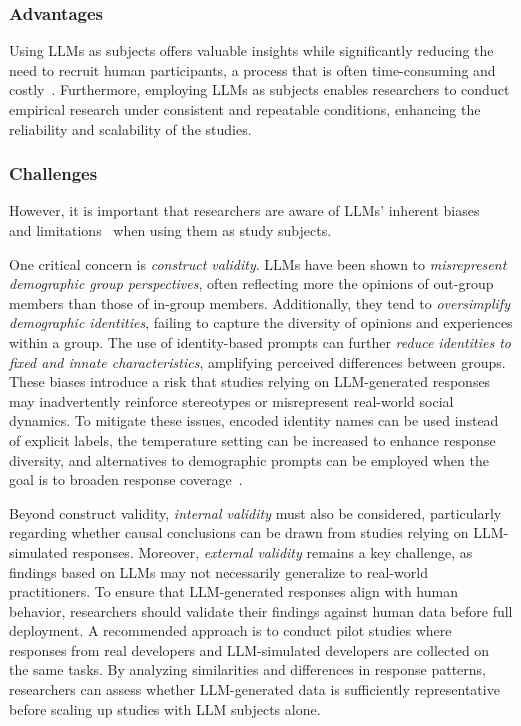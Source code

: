 \subsubsection{Advantages}

Using LLMs as subjects offers valuable insights while significantly reducing the need to recruit human participants, a process that is often time-consuming and costly~\cite{DBLP:conf/vl/Madampe0HO24}. 
Furthermore, employing LLMs as subjects enables researchers to conduct empirical research under consistent and repeatable conditions, enhancing the reliability and scalability of the studies.

\subsubsection{Challenges}

However, it is important that researchers are aware of LLMs' inherent biases~\cite{Crowell2023} and limitations~\cite{DBLP:journals/ais/HardingDLL24, DBLP:journals/corr/abs-2402-01908} when using them as study subjects. 

One critical concern is \textit{construct validity}. LLMs have been shown to \textit{misrepresent demographic group perspectives}, often reflecting more the opinions of out-group members than those of in-group members. Additionally, they tend to \textit{oversimplify demographic identities}, failing to capture the diversity of opinions and experiences within a group. The use of identity-based prompts can further \textit{reduce identities to fixed and innate characteristics}, amplifying perceived differences between groups. These biases introduce a risk that studies relying on LLM-generated responses may inadvertently reinforce stereotypes or misrepresent real-world social dynamics. To mitigate these issues, encoded identity names can be used instead of explicit labels, the temperature setting can be increased to enhance response diversity, and alternatives to demographic prompts can be employed when the goal is to broaden response coverage~\cite{DBLP:journals/ais/HardingDLL24, DBLP:journals/corr/abs-2402-01908}.

Beyond construct validity, \textit{internal validity} must also be considered, particularly regarding whether causal conclusions can be drawn from studies relying on LLM-simulated responses. Moreover, \textit{external validity} remains a key challenge, as findings based on LLMs may not necessarily generalize to real-world practitioners. To ensure that LLM-generated responses align with human behavior, researchers should validate their findings against human data before full deployment. A recommended approach is to conduct pilot studies where responses from real developers and LLM-simulated developers are collected on the same tasks. By analyzing similarities and differences in response patterns, researchers can assess whether LLM-generated data is sufficiently representative before scaling up studies with LLM subjects alone.

